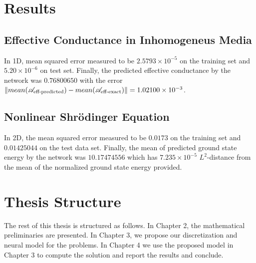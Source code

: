 \section{Results}
\subsection{Effective Conductance in Inhomogeneus Media}
In 1D, mean squared error measured to be $2.5793 \times 10^{-5}$ on the training set and $5.20 \times 10^{-6}$ on test set. Finally, the predicted effective conductance by the network was $0.76800650$ with the error $\left\lVert mean(\mathscr{A}_{\text{eff-predicted}}) - mean(\mathscr{A}_{\text{eff-exact}})\right\rVert = 1.02100 \times 10^{-3}$.

\subsection{Nonlinear Shr\"{o}dinger Equation}
In 2D, the mean squared error measured to be $0.0173$ on the training set and $0.01425044$ on the test data set. Finally, the mean of predicted ground state energy by the network was $10.17474556$ which has $7.235 \times 10^{-5}$ $L^2$-distance from the mean of the normalized ground state energy provided.

\section{Thesis Structure}

The rest of this thesis is structured as follows. In Chapter 2, the mathematical preliminaries are presented. In Chapter 3, we propose our discretization and neural model for the problems. In Chapter 4 we use the proposed model in Chapter 3 to compute the solution and report the results and conclude.












